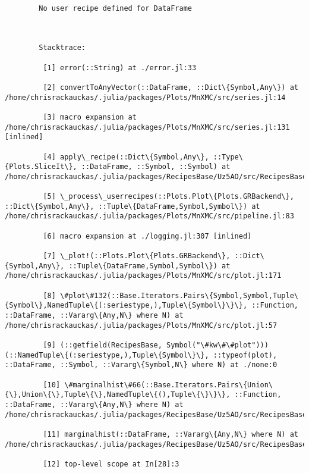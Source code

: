 \documentclass[11pt]{article}
\begin{document}
    \begin{Verbatim}[commandchars=\\\{\}]

        No user recipe defined for DataFrame

        

        Stacktrace:

         [1] error(::String) at ./error.jl:33

         [2] convertToAnyVector(::DataFrame, ::Dict\{Symbol,Any\}) at /home/chrisrackauckas/.julia/packages/Plots/MnXMC/src/series.jl:14

         [3] macro expansion at /home/chrisrackauckas/.julia/packages/Plots/MnXMC/src/series.jl:131 [inlined]

         [4] apply\_recipe(::Dict\{Symbol,Any\}, ::Type\{Plots.SliceIt\}, ::DataFrame, ::Symbol, ::Symbol) at /home/chrisrackauckas/.julia/packages/RecipesBase/Uz5AO/src/RecipesBase.jl:275

         [5] \_process\_userrecipes(::Plots.Plot\{Plots.GRBackend\}, ::Dict\{Symbol,Any\}, ::Tuple\{DataFrame,Symbol,Symbol\}) at /home/chrisrackauckas/.julia/packages/Plots/MnXMC/src/pipeline.jl:83

         [6] macro expansion at ./logging.jl:307 [inlined]

         [7] \_plot!(::Plots.Plot\{Plots.GRBackend\}, ::Dict\{Symbol,Any\}, ::Tuple\{DataFrame,Symbol,Symbol\}) at /home/chrisrackauckas/.julia/packages/Plots/MnXMC/src/plot.jl:171

         [8] \#plot\#132(::Base.Iterators.Pairs\{Symbol,Symbol,Tuple\{Symbol\},NamedTuple\{(:seriestype,),Tuple\{Symbol\}\}\}, ::Function, ::DataFrame, ::Vararg\{Any,N\} where N) at /home/chrisrackauckas/.julia/packages/Plots/MnXMC/src/plot.jl:57

         [9] (::getfield(RecipesBase, Symbol("\#kw\#\#plot")))(::NamedTuple\{(:seriestype,),Tuple\{Symbol\}\}, ::typeof(plot), ::DataFrame, ::Symbol, ::Vararg\{Symbol,N\} where N) at ./none:0

         [10] \#marginalhist\#66(::Base.Iterators.Pairs\{Union\{\},Union\{\},Tuple\{\},NamedTuple\{(),Tuple\{\}\}\}, ::Function, ::DataFrame, ::Vararg\{Any,N\} where N) at /home/chrisrackauckas/.julia/packages/RecipesBase/Uz5AO/src/RecipesBase.jl:368

         [11] marginalhist(::DataFrame, ::Vararg\{Any,N\} where N) at /home/chrisrackauckas/.julia/packages/RecipesBase/Uz5AO/src/RecipesBase.jl:368

         [12] top-level scope at In[28]:3

    \end{Verbatim}
\end{document}
